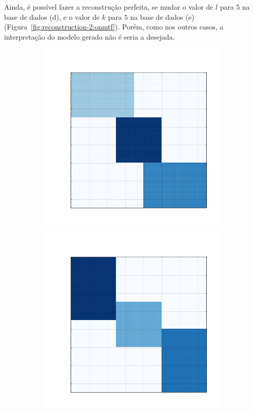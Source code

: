 \documentclass[
    12pt,                %
    oneside,            %
    a4paper,            %
    english,            %
    brazil                %
    ]{abntex2ppgsi}
\begin{document}
Ainda, é possível fazer a reconstrução perfeita, se mudar o valor de $l$ para 5 na base de dados (d), e o valor de $k$ para $5$ na base de dados (e) (Figura~\ref{fig:reconstruction-2:onmtf}).
Porém, como nos outros casos, a interpretação do modelo gerado não é seria a desejada.

\begin{figure}[H]
\centering
    \caption{
        Resultado da reconstrução da base de dados (d) com $k = 5$ e (e) com $l = 5$, respectivamente, utilizando o algoritmo \textit{ONMTF}.
    }
    \begin{subfigure}[b]{0.18\textwidth}
        \includegraphics[width=\textwidth]{img/d-reconstruction-2-onmtf.png}
    \end{subfigure}
    \begin{subfigure}[b]{0.18\textwidth}
        \includegraphics[width=\textwidth]{img/e-reconstruction-2-onmtf.png}

\end{subfigure}
\end{figure}
\end{document}
